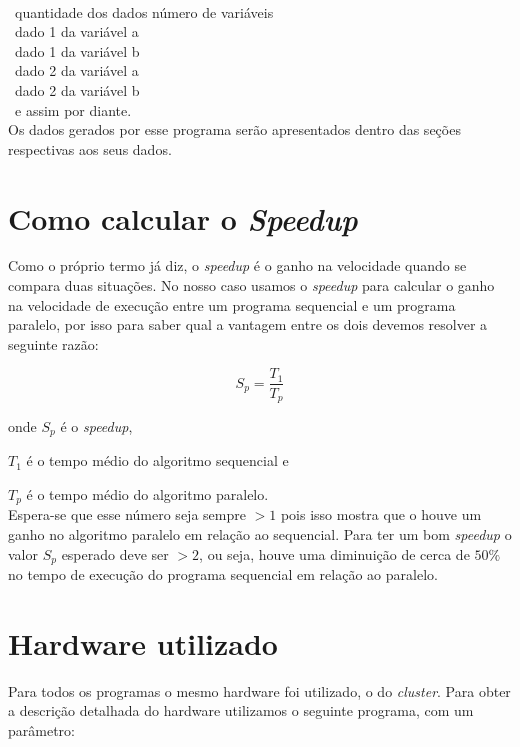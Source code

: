 \documentclass[11pt,twoside]{article}
\begin{document}
{{    \ \\
    \ \indent quantidade dos dados \indent número de variáveis\\
    \ \indent dado 1 da variável a\\
    \ \indent dado 1 da variável b\\
    \ \indent dado 2 da variável a\\
    \ \indent dado 2 da variável b\\
    \ \indent e assim por diante.
    \ \\
    
    Os dados gerados por esse programa serão apresentados dentro das seções respectivas aos
    seus dados.

\section{Como calcular o {\it Speedup }}
\label{sec:speedup}

    Como o próprio termo já diz, o {\it speedup} é o ganho na velocidade quando se compara duas
    situações. No nosso caso usamos o {\it speedup} para calcular o ganho na velocidade de
    execução entre um programa sequencial e um programa paralelo, por isso para saber qual
    a vantagem entre os dois devemos resolver a seguinte razão:
    
    \begin{equation}
        S_p = \frac{T_1}{T_p}
    \end{equation}

    onde $S_p$ é o {\it speedup},
    
    $T_1$ é o tempo médio do algoritmo sequencial e
    
    $T_p$ é o tempo médio do algoritmo paralelo.\\
    
    Espera-se que esse número seja sempre $> 1$ pois isso mostra que o houve um ganho
    no algoritmo paralelo em relação ao sequencial. Para ter um bom {\it speedup}
    o valor $S_p$ esperado deve ser $ > 2$, ou seja, houve uma diminuição de cerca de
    $50\%$ no tempo de execução do programa sequencial em relação ao paralelo.

\section{Hardware utilizado}

    Para todos os programas o mesmo hardware foi utilizado, o do \textit{cluster}. Para obter
    a descrição detalhada do hardware utilizamos o seguinte programa, com um parâmetro:
    
}}
\end{document}

